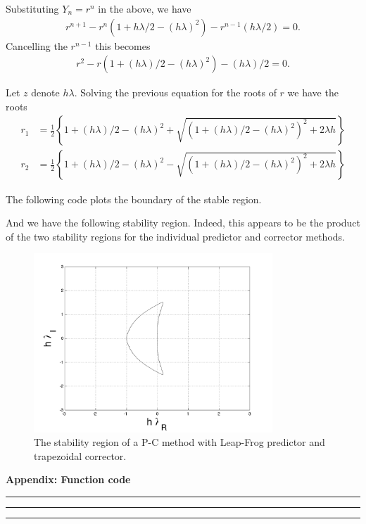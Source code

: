 \documentclass[11pt]{article}
\begin{document}
\begin{enumerate}
Substituting $Y_n = r^n$ in the above, we have
\begin{align} r^{n+1} - r^n (1 + h\lambda /2  - (h\lambda)^2 ) - r^{n-1} (h\lambda /2) = 0.\end{align}
Cancelling the $r^{n-1}$ this becomes
\begin{align} r^{2} - r (1 + (h\lambda) /2  - (h\lambda)^2 ) - (h\lambda) /2 = 0.\end{align}

Let $z$ denote $h\lambda$.
Solving the previous equation for the roots of $r$ we have the roots
\begin{align} r_1 &= \frac{1}{2} \left \{ 1 + (h\lambda) /2  - (h\lambda)^2 + \sqrt{\left( 1 + (h\lambda) /2  - (h\lambda)^2 \right ) ^2 + 2 \lambda h } \right \} \\
r_2 &= \frac{1}{2} \left \{ 1 + (h\lambda) /2  - (h\lambda)^2 - \sqrt{\left( 1 + (h\lambda) /2  - (h\lambda)^2 \right ) ^2 + 2 \lambda h } \right \} \end{align}

The following code plots the boundary of the stable region.


And we have the following stability region.
Indeed, this appears to be the product of the two stability regions for the individual predictor and corrector methods.

\begin{figure}[h!]
  \centering
    \includegraphics[width=0.8\textwidth]{andy_hw04_prb08_02.png}
  \caption{The stability region of a P-C method with Leap-Frog predictor and trapezoidal corrector.}
\end{figure}

\end{enumerate}

\clearpage
\newpage
{\huge \textbf{Appendix: Function code}}


\noindent\rule{4cm}{0.4pt}


\noindent\rule{4cm}{0.4pt}


\noindent\rule{4cm}{0.4pt}


\end{document}

